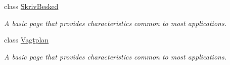 \begin{DoxyCompactItemize}
class \hyperlink{class__1aarsproeve_1_1_view_1_1_skriv_besked}{Skriv\+Besked}
\begin{DoxyCompactList}\small\item\em A basic page that provides characteristics common to most applications. \end{DoxyCompactList}\item 
class \hyperlink{class__1aarsproeve_1_1_view_1_1_vagtplan}{Vagtplan}
\begin{DoxyCompactList}\small\item\em A basic page that provides characteristics common to most applications. \end{DoxyCompactList}\end{DoxyCompactItemize}
